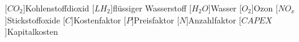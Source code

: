 \label{sec:Symbole}
\begin{acronym}[6LoWPAN]

    [$CO_2$]{Kohlenstoffdioxid}
	[$LH_2$]{flüssiger Wasserstoff}
	[$H_2O$]{Wasser}
	[$O_2$]{Ozon}
	[$NO_x$]{Stickstoffoxide}
	[$C$]{Kostenfaktor}
	[$P$]{Preisfaktor}
	[$N$]{Anzahlfaktor}
	[$CAPEX$]{Kapitalkosten}
	
\end{acronym}

